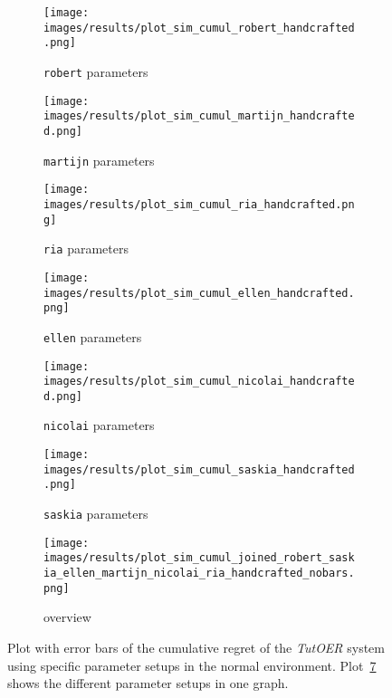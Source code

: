 \begin{figure}[ht]
	\begin{subfigure}{0.48\linewidth}
	\texttt{[image: images/results/plot\_sim\_cumul\_robert\_handcrafted.png]}
	\caption{\texttt{robert} parameters}
	\label{fig:cumul_handcrafted_robert}
	\end{subfigure}
	\hfill
	\begin{subfigure}{0.48\linewidth}
	\texttt{[image: images/results/plot\_sim\_cumul\_martijn\_handcrafted.png]}
	\caption{\texttt{martijn} parameters}
	\label{fig:cumul_handcrafted_martijn}
	\end{subfigure}
	\begin{subfigure}{0.48\linewidth}
	\texttt{[image: images/results/plot\_sim\_cumul\_ria\_handcrafted.png]}
	\caption{\texttt{ria} parameters}
	\label{fig:cumul_handcrafted_ria}
	\end{subfigure}
	\hfill
	\begin{subfigure}{0.48\linewidth}
	\texttt{[image: images/results/plot\_sim\_cumul\_ellen\_handcrafted.png]}
	\caption{\texttt{ellen} parameters}
	\label{fig:cumul_handcrafted_ellen}
	\end{subfigure}
	\begin{subfigure}{0.48\linewidth}
	\texttt{[image: images/results/plot\_sim\_cumul\_nicolai\_handcrafted.png]}
	\caption{\texttt{nicolai} parameters}
	\label{fig:cumul_handcrafted_nicolai}
	\end{subfigure}
	\hfill
	\begin{subfigure}{0.48\linewidth}
	\texttt{[image: images/results/plot\_sim\_cumul\_saskia\_handcrafted.png]}
	\caption{\texttt{saskia} parameters}
	\label{fig:cumul_handcrafted_saskia}
	\end{subfigure}
	\begin{subfigure}{\linewidth}
	\texttt{[image: images/results/plot\_sim\_cumul\_joined\_robert\_saskia\_ellen\_martijn\_nicolai\_ria\_handcrafted\_nobars.png]}
	\caption{overview}
	\label{fig:cumul_handcrafted_overview_group2}
	\end{subfigure}
	\caption{Plot with error bars of the cumulative regret of the \emph{TutOER}
	system using specific parameter setups in the normal environment.
	Plot~\ref{fig:cumul_handcrafted_overview_group2} shows the
	different parameter setups in one graph.}
	\label{fig:cumul_handcrafted_container_group2}
\end{figure}

